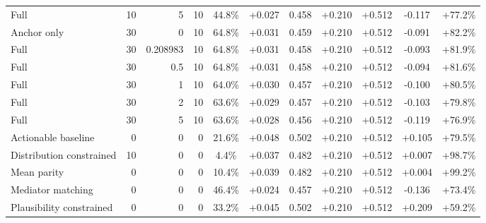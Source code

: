 \begin{table}[htbp]
\begin{tabular}{lrrrccccccc}
Full & 10 & 5 & 10 & 44.8\% & +0.027 & 0.458 & +0.210 & +0.512 & -0.117 & +77.2\% \\
Anchor only & 30 & 0 & 10 & 64.8\% & +0.031 & 0.459 & +0.210 & +0.512 & -0.091 & +82.2\% \\
Full & 30 & 0.208983 & 10 & 64.8\% & +0.031 & 0.458 & +0.210 & +0.512 & -0.093 & +81.9\% \\
Full & 30 & 0.5 & 10 & 64.8\% & +0.031 & 0.458 & +0.210 & +0.512 & -0.094 & +81.6\% \\
Full & 30 & 1 & 10 & 64.0\% & +0.030 & 0.457 & +0.210 & +0.512 & -0.100 & +80.5\% \\
Full & 30 & 2 & 10 & 63.6\% & +0.029 & 0.457 & +0.210 & +0.512 & -0.103 & +79.8\% \\
Full & 30 & 5 & 10 & 63.6\% & +0.028 & 0.456 & +0.210 & +0.512 & -0.119 & +76.9\% \\
Actionable baseline & 0 & 0 & 0 & 21.6\% & +0.048 & 0.502 & +0.210 & +0.512 & +0.105 & +79.5\% \\
Distribution constrained & 10 & 0 & 0 & 4.4\% & +0.037 & 0.482 & +0.210 & +0.512 & +0.007 & +98.7\% \\
Mean parity & 0 & 0 & 0 & 10.4\% & +0.039 & 0.482 & +0.210 & +0.512 & +0.004 & +99.2\% \\
Mediator matching & 0 & 0 & 0 & 46.4\% & +0.024 & 0.457 & +0.210 & +0.512 & -0.136 & +73.4\% \\
Plausibility constrained & 0 & 0 & 0 & 33.2\% & +0.045 & 0.502 & +0.210 & +0.512 & +0.209 & +59.2\% \\
\bottomrule
\end{tabular}
\end{table}